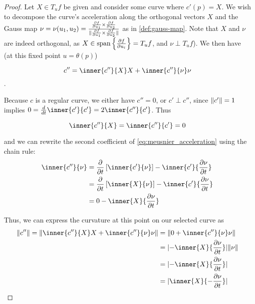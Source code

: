 	\begin{proof}
	Let $X\in T_u f$ be given and consider some curve where
  $c'(p) = X$.
  We wish to decompose the curve's acceleration along the  orthogonal vectors $X$ and
	the Gauss map $\nu = \nu(u_1, u_2) =
		\frac{\frac{\partial f}{\partial u_1} \times \frac{\partial f}{\partial u_2}}
		{\Vert\frac{\partial f}{\partial u_1} \times \frac{\partial f}{\partial u_2}\Vert}$ as in \cref{def:gauss-map}.
		Note that $X$ and $\nu$ are indeed orthogonal,
		as $ X \in \mathrm{span}\left\{\frac{\partial f}{\partial u_i}\right\} = T_u f$, and
		$\nu \perp T_u f$).
	 We then have (at this fixed point $u=\theta(p)$)
		
		\begin{equation} \label{eq:meusnier_acceleration}
			c'' = \inner{c''}{X} X + \inner{c''}{\nu}\nu
			\end{equation}. 
	
	Because $c$ is a regular curve, we either have $c''=0$,
	or $c' \perp c''$, since $\Vert c'\Vert = 1$ implies
	$0 = \frac{d}{dt} \inner{c'}{c'} = 2 \inner{c''}{c'} $. Thus
	
		\[ \inner{c''}{X} = \inner{c''}{c'} = 0 \]

	
	 and we can rewrite the second coefficient of \cref{eq:meusnier_acceleration} using the chain rule: %
	\begin{gather}
  \begin{aligned}
		\inner{c''}{\nu} &=
		\frac{\partial}{\partial t}\left[ \inner{c'}{\nu} \right]
			- \inner{c'}{\frac{\partial \nu}{\partial t}} \\
			&= \frac{\partial}{\partial t}\left[ \inner{X}{\nu} \right]
			- \inner{c'}{\frac{\partial \nu}{\partial t}} \\
			&= 0 - \inner{X}{\frac{\partial \nu}{\partial t}}
      \end{aligned}
			\end{gather}
	
	Thus, we can express the curvature at this point on our selected curve as
	\begin{align}
	\vnorm{c''} = \vnorm{\inner{c''}{X} X + \inner{c''}{\nu}\nu}
	&= \vnorm{0 + \inner{c''}{\nu}\nu}  \nonumber \\
	&= \abs{- \inner{X}{\frac{\partial \nu}{\partial t}}}\vnorm{\nu}  \nonumber \\
	&= \abs{- \inner{X}{\frac{\partial \nu}{\partial t}}}  \nonumber \\
	&=  \abs{\inner{X}{-\frac{\partial \nu}{\partial t}}} \label{eq:expand_accel_norm}
	\end{align}
	

\end{proof}
